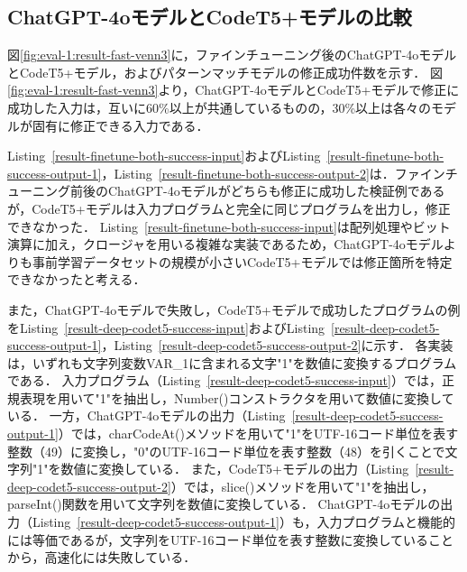 \documentclass[11pt]{jreport}
\begin{document}

\subsection{ChatGPT-4oモデルとCodeT5+モデルの比較}


図\ref{fig:eval-1:result-fast-venn3}に，ファインチューニング後のChatGPT-4oモデルとCodeT5+モデル，およびパターンマッチモデルの修正成功件数を示す．
図\ref{fig:eval-1:result-fast-venn3}より，ChatGPT-4oモデルとCodeT5+モデルで修正に成功した入力は，互いに60\%以上が共通しているものの，30\%以上は各々のモデルが固有に修正できる入力である．

Listing~\ref{result-finetune-both-success-input}およびListing~\ref{result-finetune-both-success-output-1}，Listing~\ref{result-finetune-both-success-output-2}は．ファインチューニング前後のChatGPT-4oモデルがどちらも修正に成功した検証例であるが，CodeT5+モデルは入力プログラムと完全に同じプログラムを出力し，修正できなかった．
Listing~\ref{result-finetune-both-success-input}は配列処理やビット演算に加え，クロージャを用いる複雑な実装であるため，ChatGPT-4oモデルよりも事前学習データセットの規模が小さいCodeT5+モデルでは修正箇所を特定できなかったと考える．

また，ChatGPT-4oモデルで失敗し，CodeT5+モデルで成功したプログラムの例をListing~\ref{result-deep-codet5-success-input}およびListing~\ref{result-deep-codet5-success-output-1}，Listing~\ref{result-deep-codet5-success-output-2}に示す．
各実装は，いずれも文字列変数VAR\_1に含まれる文字"1"を数値に変換するプログラムである．
入力プログラム（Listing~\ref{result-deep-codet5-success-input}）では，正規表現を用いて"1"を抽出し，Number()コンストラクタを用いて数値に変換している．
一方，ChatGPT-4oモデルの出力（Listing~\ref{result-deep-codet5-success-output-1}）では，charCodeAt()メソッドを用いて"1"をUTF-16コード単位を表す整数（49）に変換し，"0"のUTF-16コード単位を表す整数（48）を引くことで文字列"1"を数値に変換している．
また，CodeT5+モデルの出力（Listing~\ref{result-deep-codet5-success-output-2}）では，slice()メソッドを用いて"1"を抽出し，parseInt()関数を用いて文字列を数値に変換している．
ChatGPT-4oモデルの出力（Listing~\ref{result-deep-codet5-success-output-1}）も，入力プログラムと機能的には等価であるが，文字列をUTF-16コード単位を表す整数に変換していることから，高速化には失敗している．
\end{document}
